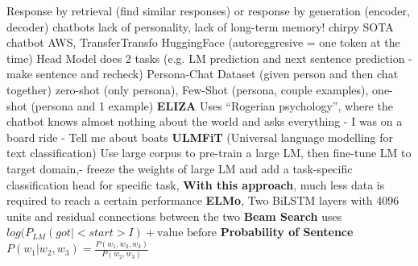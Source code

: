 \documentclass[8pt]{extarticle}
\begin{document}
\begin{multicols*}{3}
\newline Response by retrieval (find similar responses) or response by generation (encoder, decoder)
 chatbots lack of personality, lack of long-term memory!
\newline chirpy SOTA chatbot AWS, TransferTransfo HuggingFace (autoreggresive  = one token at the time)
 Head Model does 2 tasks (e.g. LM prediction and next sentence prediction - make sentence and recheck)
\newline Persona-Chat Dataset (given person and then chat together)
\newline zero-shot (only persona), Few-Shot (persona, couple examples), one-shot (persona and 1 example)
\newline \textbf{ELIZA} Uses “Rogerian psychology”, where the chatbot knows almost nothing about the world and asks everything -  I was on a board ride - Tell me about boats
\newline \textbf{ULMFiT} (Universal language modelling for text classification)
\newline Use large corpus to pre-train a large LM, then fine-tune LM to target domain,- freeze the weights of large LM and add a task-specific classification head for specific task, \textbf{With this approach}, much less data is required to reach a certain performance
\newline \textbf{ELMo}, Two BiLSTM layers with 4096 units and residual connections between the two
\newline \textbf{Beam Search} uses $ log(P_{LM}(got | <start> I) + \textrm{value before}$
\newline \textbf{Probability of Sentence} $P(w_1 | w_2, w_3) = \frac{P(w_1, w_2, w_3)}{P(w_2, w_3)} $
\end{multicols*}
\end{document}
